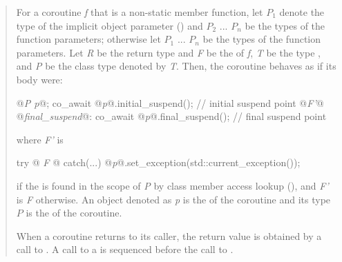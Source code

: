 \begin{quote}
\pnum
For a coroutine \textit{f} that is a non-static member function, let $P_1$ denote the type of the implicit object parameter () and $P_2$ ... $P_n$ be the types of the function parameters; otherwise let $P_1$ ... $P_n$ be the types of the function parameters.
Let \textit{R} be the return type and \textit{F} be the 
of \textit{f}, \textit{T} be the type , and \textit{P} be the class type denoted by \textit{T}. 
Then, the coroutine behaves as if its body were:
\begin{codeblock}
  {
     @\textit{P p}@;
     co_await @\textit{p}@.initial_suspend(); // initial suspend point
     @\textit{F'}@
  @\textit{final_suspend}@:
     co_await @\textit{p}@.final_suspend(); // final suspend point
  }
\end{codeblock}
where \textit{F'} is 
\begin{codeblock}
	try {@\textit{ F }@} catch(...) { @\textit{p}@.set_exception(std::current_exception()); }
\end{codeblock}
if the   is found in the scope of \textit{P}
by class member access lookup (), and \textit{F'} is \textit{F} otherwise.
An object denoted as \textit{p} is the  of
the coroutine and its type $P$ is the 
of the coroutine.


\pnum
When a coroutine returns to its caller, the return value is obtained by a call to . A call to a  is sequenced before the call to .



\end{quote}
